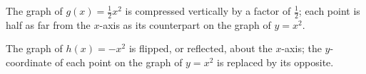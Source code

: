 \documentclass[10pt,]{book}
\theoremstyle{plain}
\theoremstyle{definition}
\theoremstyle{definition}
\numberwithin{equation}{section}
\newcommand{\hrulethin}  {\noalign{\hrule height 0.04em}}
\newcommand{\hrulethick} {\noalign{\hrule height 0.11em}}
\newcounter{figstack}
\newcounter{figindex}
\newlength\fight
\newcommand\pushValignCaptionBottom[5][b]{%
\stepcounter{figstack}%
\expandafter\def\csname %
figalign\romannumeral\value{figstack}\endcsname{#1}%
\expandafter\def\csname %
figtype\romannumeral\value{figstack}\endcsname{#2}%
\expandafter\def\csname %
figwd\romannumeral\value{figstack}\endcsname{#3}%
\expandafter\def\csname %
figcontent\romannumeral\value{figstack}\endcsname{#4}%
\expandafter\def\csname %
figcap\romannumeral\value{figstack}\endcsname{#5}%
\setbox0=\hbox{%
\begin{#2}{#3}#4\end{#2}}%
\ifdim\dimexpr\ht0+\dp0\relax>\fight\global\setlength{\fight}{%
\dimexpr\ht0+\dp0\relax}\fi%
}
\newcommand\popValignCaptionBottom{%
\setcounter{figindex}{0}%
\hfill%
\whiledo{\value{figindex}<\value{figstack}}{%
\stepcounter{figindex}%
\def\tmp{\csname figwd\romannumeral\value{figindex}\endcsname}%
\begin{\csname figtype\romannumeral\value{figindex}\endcsname}[t]{\tmp}%
\centering%
\stackinset{c}{}%
{\csname figalign\romannumeral\value{figindex}\endcsname}{}%
{\csname figcontent\romannumeral\value{figindex}\endcsname}%
{\rule{0pt}{\fight}}\par%
\csname figcap\romannumeral\value{figindex}\endcsname%
\end{\csname figtype\romannumeral\value{figindex}\endcsname}%
\hfill%
}%
\setcounter{figstack}{0}%
\setlength{\fight}{0pt}%
\hfill%
}
\begin{document}
    The graph of \(g(x) = \frac{1}{2}x^2\) is compressed vertically by a factor of \(\frac{1}{2}\); each point is half as far from the \(x\)-axis as its counterpart on the graph of \(y = x^2\).
%
\leavevmode%
\par

    The graph of \(h(x) = −x^2\) is flipped, or reflected, about the \(x\)-axis; the \(y\)-coordinate of each point on the graph of \(y = x^2\) is replaced by its opposite.
%
\par
\end{document}
